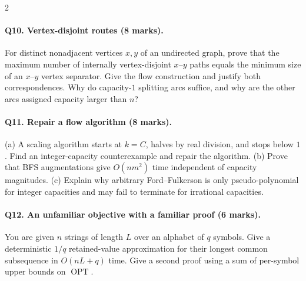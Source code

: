 \documentclass[10pt]{article}
\theoremstyle{definition}
\newcommand{\OPT}{\operatorname{OPT}}
\begin{document}
\begin{multicols*}{2}
\paragraph{Q10. Vertex-disjoint routes (8 marks).}
For distinct nonadjacent vertices $x,y$ of an undirected graph, prove that
the maximum number of internally vertex-disjoint $x$--$y$ paths equals
the minimum size of an $x$--$y$ vertex separator.  Give the flow construction
and justify both correspondences.  Why do capacity-$1$ splitting arcs
suffice, and why are the other arcs assigned capacity larger than $n$?

\paragraph{Q11. Repair a flow algorithm (8 marks).}
(a) A scaling algorithm starts at $k=C$, halves by real division, and stops
below $1$.  Find an integer-capacity counterexample and repair the algorithm.
(b) Prove that BFS augmentations give $O(nm^2)$ time independent of capacity
magnitudes.  (c) Explain why arbitrary Ford--Fulkerson is only
pseudo-polynomial for integer capacities and may fail to terminate for
irrational capacities.

\paragraph{Q12. An unfamiliar objective with a familiar proof (6 marks).}
You are given $n$ strings of length $L$ over an alphabet of $q$ symbols.
Give a deterministic $1/q$ retained-value approximation for their longest
common subsequence in $O(nL+q)$ time.  Give a second proof using a sum of
per-symbol upper bounds on $\OPT$.


\end{multicols*}
\end{document}
